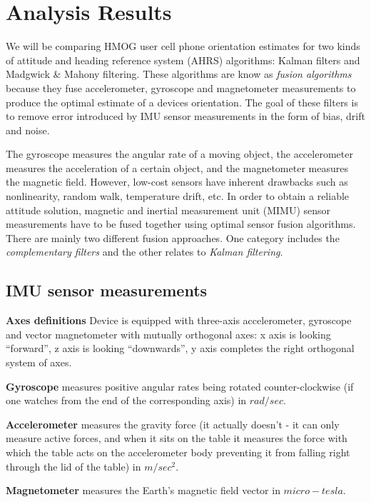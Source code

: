 \documentclass{article}
\begin{document}
\pagebreak

\section{Analysis Results}

We will be comparing HMOG user cell phone orientation estimates for two kinds of attitude and heading reference system (AHRS) algorithms: Kalman filters and Madgwick \& Mahony filtering. These algorithms are know as \textit{fusion algorithms} because they fuse accelerometer, gyroscope and magnetometer measurements to produce the optimal estimate of a devices orientation. The goal of these filters is to remove error introduced by IMU sensor measurements in the form of bias, drift and noise.

The gyroscope measures the angular rate of a moving object, the accelerometer measures the acceleration of a certain object, and the magnetometer measures the magnetic field. However, low-cost sensors have inherent drawbacks such as nonlinearity, random walk, temperature drift, etc. In order to obtain a reliable attitude solution, magnetic and inertial measurement unit (MIMU) sensor measurements have to be fused together using optimal sensor fusion algorithms. There are mainly two different fusion approaches. One category includes the \textit{complementary filters} and the other relates to \textit{Kalman filtering}.

\subsection{IMU sensor measurements}

\textbf{Axes definitions} Device is equipped with three-axis accelerometer, gyroscope and vector magnetometer with mutually orthogonal axes: x axis is looking “forward”, z axis is looking “downwards”, y axis completes the right orthogonal system of axes.

\textbf{Gyroscope} measures positive angular rates being rotated counter-clockwise (if one watches from the end of the corresponding axis) in $rad/sec$.

\textbf{Accelerometer} measures the gravity force (it actually doesn’t - it can only measure active forces, and when it sits on the table it measures the force with which the table acts on the accelerometer body preventing it from falling right through the lid of the table) in $m/sec^{2}$.

\textbf{Magnetometer} measures the Earth’s magnetic field vector in $micro-tesla$.
\end{document}
